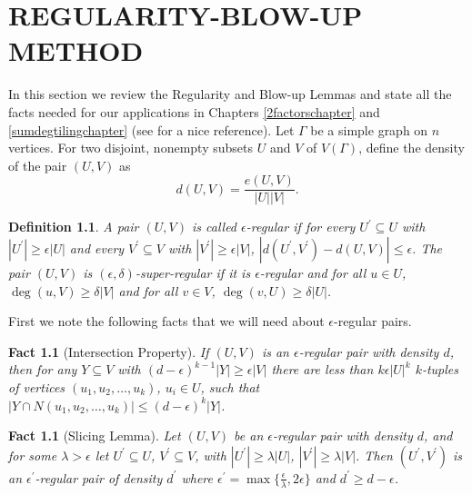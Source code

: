 \documentclass[oneside,12pt]{memoir}
\newtheorem{fact}[theorem]{Fact}
\newtheorem{definition}[theorem]{Definition}
\newcommand{\ep}{\epsilon}
\begin{document}
\chapter{REGULARITY-BLOW-UP METHOD}\label{regularitychapter}

\DoubleSpacing
\setlength{\parindent}{.5in}


In this section we review the Regularity and Blow-up Lemmas and state all the facts needed for our applications in Chapters \ref{2factorschapter} and \ref{sumdegtilingchapter} (see \cite{KS} for a nice reference). Let $\varGamma$ be a simple graph on $n$ vertices. For two disjoint, nonempty subsets $U$ and $V$ of $V(\varGamma)$, define the density of the pair $(U,V)$ as
\[
d(U,V)=\frac{e(U,V)}{|U||V|}.
\]

\begin{definition}
A pair $(U,V)$ is called $\ep$-\emph{regular} if for every $%
U^{\prime }\subseteq U$ with $|U^{\prime }|\geq \ep |U|$ and every $%
V^{\prime }\subseteq V$ with $|V^{\prime }|\geq \ep |V|$, $
|d(U^{\prime },V^{\prime })-d(U,V)|\leq \ep $. The pair $\left(
U,V\right) $ is $( \ep ,\delta ) $-\emph{super-regular}
if it is $\ep $-regular and for all $u\in U$, 
$\deg\left(
u,V\right) \geq \delta \left| V\right| $ and for all $v\in V$, $\deg\left(
v,U\right) \geq \delta \left| U\right| $.
\end{definition}

First we note the following facts that we will need about $\ep$-regular pairs.

\begin{fact}[Intersection Property]\label{interprop}
\label{deg} If $(U,V)$ is an $\ep $-regular pair with density $d$,
then for any $Y\subseteq V$ with $(d-\ep)^{k-1}|Y|\geq \ep |V|$ there are less than
$k\ep |U|^k$ $k$-tuples of vertices $(u_1, u_2, \dots, u_k)$, $u_i\in U$, such that $|Y\cap N(u_1, u_2, \dots, u_k)|\leq (d-\ep)^k|Y|$.
\end{fact}


\begin{fact}[Slicing Lemma]\label{slicing}
\label{slice} Let $(U,V)$ be an $\ep $-regular pair with density $d$, and for some $\lambda >\ep $ let $U^{\prime }\subseteq U$, $V^{\prime }\subseteq V$, with $|U^{\prime }|\geq \lambda |U|$, $|V^{\prime }|
\geq \lambda |V|$. Then $(U^{\prime },V^{\prime })$ is an $\ep
^{\prime }$-regular pair of density $d^{\prime }$ where $\ep
^{\prime }=\max \{\frac{\ep }{\lambda },2\ep \}$ and $
d^{\prime}\ge d-\ep $.
\end{fact}
\end{document}
